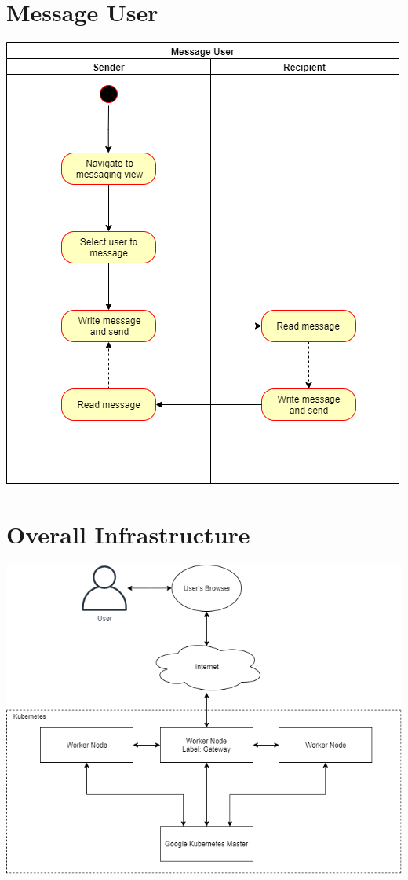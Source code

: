\documentclass[12pt]{article}
\begin{document}
\section{Message User}
    \begin{center}\includegraphics[width=\textwidth]{images/MessageUser.png}\end{center}

\section{Overall Infrastructure}
    \begin{center}\includegraphics[width=\textwidth]{images/hardware-diagram.png}\end{center}
\end{document}

